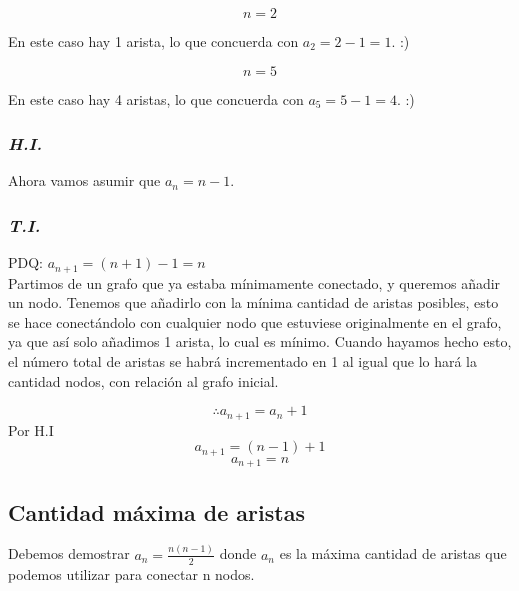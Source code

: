 \documentclass{article}
\begin{document}
\[ n = 2 \]

\begin{center}
\end{center}
En este caso hay 1 arista, lo que concuerda con $a_2 = 2 - 1 = 1$. :)


\[ n = 5 \]

\begin{center}
\end{center}
En este caso hay 4 aristas, lo que concuerda con $a_5 = 5 - 1 = 4$. :)

\subsubsection*{\emph{H.I.}}
Ahora vamos asumir que $ a_n = n - 1 $.

\subsubsection*{\emph{T.I.}}
PDQ: $a_{n+1} = (n + 1) -1 = n$ \\
Partimos de un grafo que ya estaba mínimamente conectado, y queremos añadir un
nodo. Tenemos que añadirlo con la mínima cantidad de aristas posibles, esto se
hace conectándolo con cualquier nodo que estuviese originalmente en el grafo,
ya que así solo añadimos 1 arista, lo cual es mínimo. Cuando hayamos hecho
esto, el número total de aristas se habrá incrementado en 1 al igual que lo
hará la cantidad nodos, con relación al grafo inicial.

\[\therefore a_{n+1} = a_{n} + 1\]
Por H.I
\[a_{n+1} = (n - 1) + 1\]
\[a_{n+1} = n\]
 

\subsection{Cantidad máxima de aristas}
Debemos demostrar $a_n = \frac{n(n-1)}{2} $ donde $a_n$ es la máxima cantidad de 
aristas que podemos utilizar para conectar n nodos.
\end{document}
